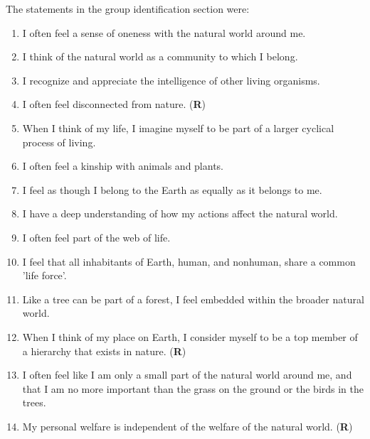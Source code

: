 The statements in the group identification section were:

\begin{enumerate}
	\item I often feel a sense of oneness with the natural world around me.
	\item I think of the natural world as a community to which I belong.
	\item I recognize and appreciate the intelligence of other living organisms.
	\item I often feel disconnected from nature. (\textbf{R})
	\item When I think of my life, I imagine myself to be part of a larger cyclical process of living.
	\item I often feel a kinship with animals and plants.
	\item I feel as though I belong to the Earth as equally as it belongs to me.
	\item I have a deep understanding of how my actions affect the natural world.
	\item I often feel part of the web of life.
	\item I feel that all inhabitants of Earth, human, and nonhuman, share a common 'life force'.
	\item Like a tree can be part of a forest, I feel embedded within the broader natural world.
	\item When I think of my place on Earth, I consider myself to be a top member of a hierarchy that exists in nature. (\textbf{R})
	\item I often feel like I am only a small part of the natural world around me, and that I am no more important than the grass on the ground or the birds in the trees.
	\item My personal welfare is independent of the welfare of the natural world. (\textbf{R})
\end{enumerate}
